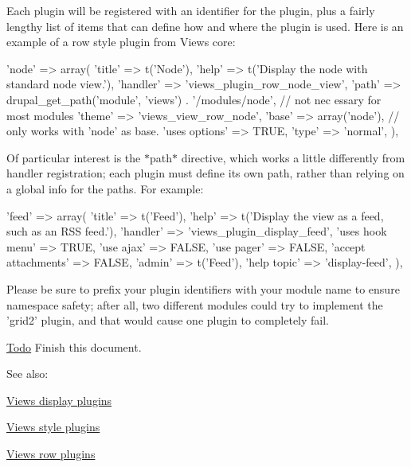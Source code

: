 Each plugin will be registered with an identifier for the plugin, plus a fairly lengthy list of items that can define how and where the plugin is used. Here is an example of a row style plugin from Views core: 
\begin{DoxyCode}
     'node' => array(
       'title' => t('Node'),
       'help' => t('Display the node with standard node view.'),
       'handler' => 'views_plugin_row_node_view',
       'path' => drupal_get_path('module', 'views') . '/modules/node', // not nec
      essary for most modules
       'theme' => 'views_view_row_node',
       'base' => array('node'), // only works with 'node' as base.
       'uses options' => TRUE,
       'type' => 'normal',
     ),
\end{DoxyCode}


Of particular interest is the $\ast$path$\ast$ directive, which works a little differently from handler registration; each plugin must define its own path, rather than relying on a global info for the paths. For example: 
\begin{DoxyCode}
    'feed' => array(
      'title' => t('Feed'),
      'help' => t('Display the view as a feed, such as an RSS feed.'),
      'handler' => 'views_plugin_display_feed',
      'uses hook menu' => TRUE,
      'use ajax' => FALSE,
      'use pager' => FALSE,
      'accept attachments' => FALSE,
      'admin' => t('Feed'),
      'help topic' => 'display-feed',
     ),
\end{DoxyCode}


Please be sure to prefix your plugin identifiers with your module name to ensure namespace safety; after all, two different modules could try to implement the 'grid2' plugin, and that would cause one plugin to completely fail.

\begin{Desc}
\item[\hyperlink{todo__todo000088}{Todo}]Finish this document.\end{Desc}
See also:
\begin{DoxyItemize}
\item \hyperlink{group__views__display__plugins}{Views display plugins }
\item \hyperlink{group__views__style__plugins}{Views style plugins }
\item \hyperlink{group__views__row__plugins}{Views row plugins } 
\end{DoxyItemize}